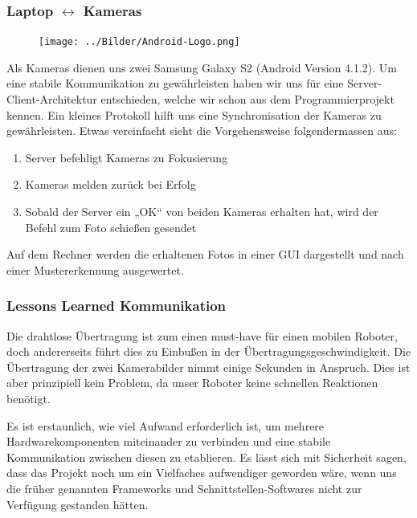 \documentclass[12pt,a4paper]{article}
\begin{document}
\subsubsection*{Laptop $\leftrightarrow$ Kameras}
\begin{figure}
  \vspace{-40pt}
  \begin{center}
    \texttt{[image: ../Bilder/Android-Logo.png]}
  \end{center}
  \vspace{-20pt}
\end{figure}
Als Kameras dienen uns zwei Samsung Galaxy S2 (Android Version 4.1.2).
Um eine stabile Kommunikation zu gewährleisten haben wir uns für eine Server-Client-Architektur entschieden, welche wir schon aus dem Programmierprojekt kennen.
Ein kleines Protokoll hilft uns eine Synchronisation der Kameras zu gewährleisten.
Etwas vereinfacht sieht die Vorgehensweise folgendermassen aus:
\begin{enumerate}
\item
Server befehligt Kameras zu Fokusierung
\item
Kameras melden zurück bei Erfolg
\item
Sobald der Server ein „OK“ von beiden Kameras erhalten hat, wird der Befehl zum Foto schießen gesendet
\end{enumerate}

Auf dem Rechner werden die erhaltenen Fotos in einer GUI dargestellt und nach einer Mustererkennung ausgewertet.

\subsubsection*{Lessons Learned Kommunikation}
Die drahtlose Übertragung ist zum einen must-have für einen mobilen Roboter, doch andererseits führt dies zu Einbußen in der Übertragungsgeschwindigkeit. Die Übertragung der zwei Kamerabilder nimmt einige Sekunden in Anspruch. Dies ist aber prinzipiell kein Problem, da unser Roboter keine schnellen Reaktionen benötigt.

Es ist erstaunlich, wie viel Aufwand erforderlich ist, um mehrere Hardwarekomponenten miteinander zu verbinden und eine stabile Kommunikation zwischen diesen zu etablieren. Es lässt sich mit Sicherheit sagen, dass das Projekt noch um ein Vielfaches aufwendiger geworden wäre, wenn uns die früher genannten Frameworks und Schnittstellen-Softwares nicht zur Verfügung gestanden hätten.
\end{document}
